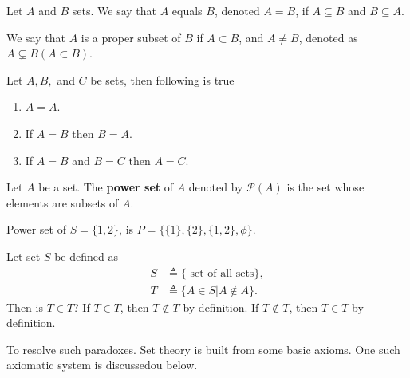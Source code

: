 \documentclass[a4paper,english,12pt]{article}
\begin{document}
\begin{defn} Let ${A}$ and ${B}$ sets. We say that ${A}$ equals ${B}$, denoted ${A}={B}$, if ${A}\subseteq {B}$ and ${B}\subseteq {A}$. 
\end{defn}
\begin{defn} We say that ${A}$ is a proper subset of ${B}$ if ${A}\subset {B}$, and ${A}\neq {B}$, denoted as ${A}\varsubsetneq {B} ({A}\subset {B})$.
\end{defn} 
\begin{lem} Let ${A},{B},$ and ${C}$ be sets, then following is true
\begin{enumerate}
 \item ${A}= {A}$.
 \item If ${A}= {B}$ then ${B}= {A}$.
 \item If ${A}= {B}$ and ${B}= {C}$ then ${A}= {C}$.
\end{enumerate}
\end{lem}
\begin{defn} Let ${A}$ be a set. The \textbf{power set} of ${A}$ denoted by $\mathcal{P}(A)$ is the set whose elements are subsets of ${A}$.
\end{defn}

\begin{exmp}Power set of $S=\{1,2\}$, is ${P}=\{\{1\},\{2\},\{1,2\},\phi\}$.
\end{exmp}

\begin{exmp} Let set $S$ be defined as 
\begin{align*}
S &\triangleq \{\text{ set of all sets}\},\\
T &\triangleq \{{A}\in{S}|{A}\not\in{A} \}.
\end{align*}
Then is $T \in T$? If $T \in T$, then $ T \not\in T$ by definition. If $T \not\in T$, then $T \in T$ by definition.
\end{exmp}
To resolve such paradoxes. Set theory is built from some basic axioms. One such axiomatic system is discussedou  below.
\end{document}
